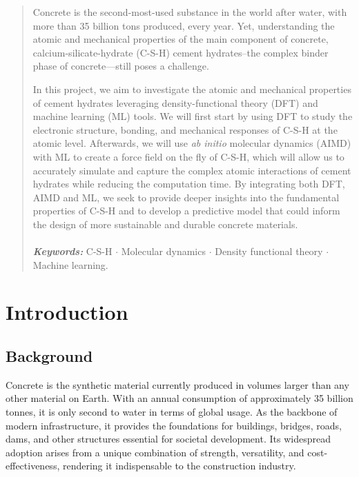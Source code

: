 \documentclass[12pt, titlepage, twoside, openright, usernames, dvipsnames]{thesis}
\theoremstyle{definition}
\theoremstyle{definition}
\begin{document}
\begin{abstract} 
Concrete is the second-most-used substance in the world after water, with more than 35 billion tons produced, every year. Yet, understanding the atomic and mechanical properties of the main component of concrete, calcium-silicate-hydrate (C-S-H) cement hydrates--the complex binder phase of concrete---still poses a challenge.
  
In this project, we aim to investigate the atomic and mechanical properties of cement hydrates leveraging density-functional theory (DFT) and machine learning (ML) tools. We will first start by using DFT to study the electronic structure, bonding, and mechanical responses of C-S-H  at the atomic level. Afterwards, we will use \emph{ab initio} molecular dynamics (AIMD) with ML to create a force field on the fly of C-S-H, which will allow us to accurately simulate and capture the complex atomic interactions of cement hydrates while reducing the computation time. By integrating both DFT, AIMD and ML, we seek to provide deeper insights into the fundamental properties of C-S-H and to develop a predictive model that could inform the design of more sustainable and durable concrete materials.
 \\
  \\
  \emph{\textbf{Keywords:}} C-S-H $\cdot$  Molecular dynamics $\cdot$ Density functional theory $\cdot$ Machine learning.
\end{abstract}

\tableofcontents
{}
\listoffigures
{}
\listoftables
{}


\mainbody
\chapter{Introduction}\label{Introduction}\glsresetall 

  \section{Background}\label{Background} 
  Concrete is the synthetic material currently produced in volumes larger than any other material on Earth. With an annual consumption of approximately 35 billion tonnes, it is only second to water in terms of global usage\cite{Monteiro2017, VanDamme2018}. As the backbone of modern infrastructure, it provides the foundations for buildings, bridges, roads, dams, and other structures essential for societal development. Its widespread adoption arises from a unique combination of strength, versatility, and cost-effectiveness\cite{Mehta2014}, rendering it indispensable to the construction industry.
\end{document}
